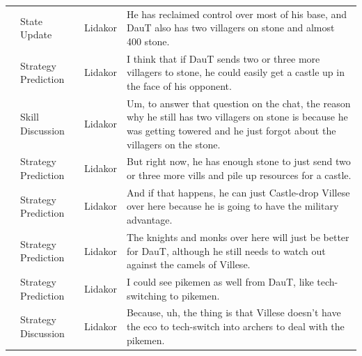 {\begin{longtable}{@{}>{\theAppRow}r|L{2.3cm}L{1.0cm}U{11.55cm}@{}}
    & State Update          & Lidakor & He has reclaimed control over most of his base, and DauT also has two villagers on stone and almost 400 stone.                                                                                                                                                                                  \\
    & Strategy Prediction   & Lidakor & I think that if DauT sends two or three more villagers to stone, he could easily get a castle up in the face of his opponent.                                                                                                                                                                   \\
    & Skill Discussion      & Lidakor & Um, to answer that question on the chat, the reason why he still has two villagers on stone is because he was getting towered and he just forgot about the villagers on the stone.                                                                                                              \\
    & Strategy Prediction   & Lidakor & But right now, he has enough stone to just send two or three more vills and pile up resources for a castle.                                                                                                                                                                                     \\
    & Strategy Prediction   & Lidakor & And if that happens, he can just Castle-drop Villese over here because he is going to have the military advantage.                                                                                                                                                                              \\
    & Strategy Prediction   & Lidakor & The knights and monks over here will just be better for DauT, although he still needs to watch out against the camels of Villese.                                                                                                                                                               \\
    & Strategy Prediction   & Lidakor & I could see pikemen as well from DauT, like tech-switching to pikemen.                                                                                                                                                                                                                          \\
    & Strategy Discussion   & Lidakor & Because, uh, the thing is that Villese doesn't have the eco to tech-switch into archers to deal with the pikemen.                                                                                                                                                                               \\

\end{longtable}}
